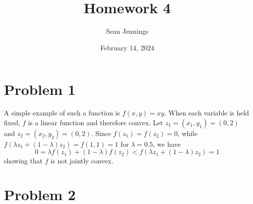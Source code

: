 \documentclass{homework}
\title{Homework 4}
\author{Sean Jennings}
\date{February 14, 2024}
\begin{document}
\maketitle

\section{Problem 1}
A simple example of such a function is $f(x, y) = xy$. When each variable
is held fixed, $f$ is a linear function and therefore convex. Let
$z_1 = (x_1, y_1) = (0, 2)$ and $z_2 = (x_2, y_2) = (0, 2)$.
Since $f(z_1) = f(z_2) = 0$, while $f(\lambda z_1 + (1 - \lambda) z_2) = f(1, 1) = 1$ for $\lambda = 0.5$,
we have
\begin{equation}
    0 = \lambda f(z_1) + (1 - \lambda) f(z_2) < f(\lambda z_1 + (1 - \lambda) z_2) = 1
\end{equation}
showing that $f$ is not jointly convex.

\section{Problem 2}
\end{document}
